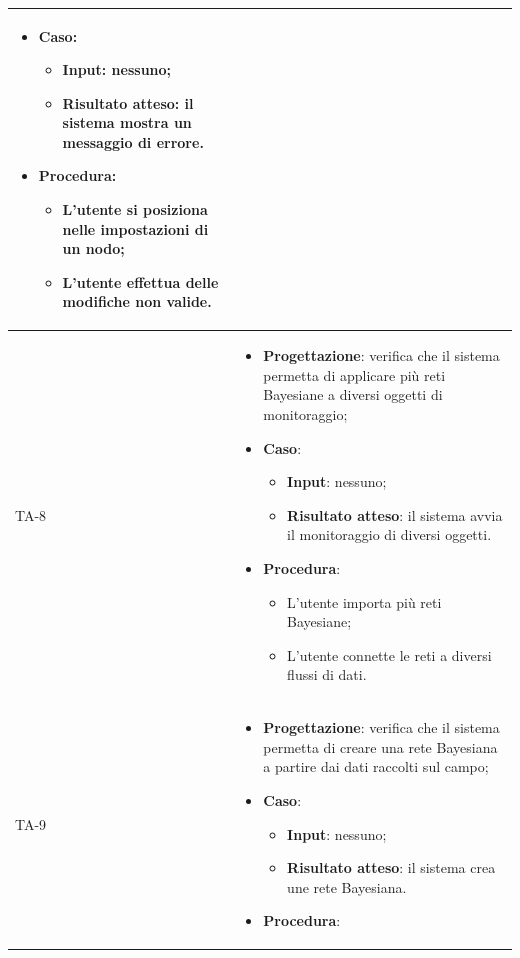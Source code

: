 \begin{longtable}{|C{2.5cm}|C{13cm}|}
\begin{itemize}
	\item \textbf{Caso}: 
	\begin{itemize}
		\item \textbf{Input}: nessuno;
		\item \textbf{Risultato atteso}: il sistema mostra un messaggio di errore.
	\end{itemize}
	\item \textbf{Procedura}:
	\begin{itemize}
		\item L'utente si posiziona nelle impostazioni di un nodo;
		\item L'utente effettua delle modifiche non valide.
	\end{itemize} 
\end{itemize} \\
\hline
{TA-8} &
\begin{itemize}
	\item \textbf{Progettazione}: verifica che il sistema permetta di applicare più reti Bayesiane a diversi oggetti di monitoraggio;
	\item \textbf{Caso}: 
	\begin{itemize}
		\item \textbf{Input}: nessuno;
		\item \textbf{Risultato atteso}: il sistema avvia il monitoraggio di diversi oggetti.
	\end{itemize}
	\item \textbf{Procedura}:
	\begin{itemize}
		\item L'utente importa più reti Bayesiane;
		\item L'utente connette le reti a diversi flussi di dati.
	\end{itemize} 
\end{itemize} \\
\hline
{TA-9} &
\begin{itemize}
	\item \textbf{Progettazione}: verifica che il sistema permetta di creare una rete Bayesiana a partire dai dati raccolti
	sul campo;
	\item \textbf{Caso}: 
	\begin{itemize}
		\item \textbf{Input}: nessuno;
		\item \textbf{Risultato atteso}: il sistema crea une rete Bayesiana.
	\end{itemize}
	\item \textbf{Procedura}:
	\begin{itemize}

\end{itemize}
\end{itemize}
\end{longtable}
